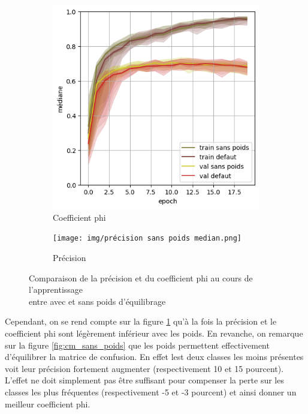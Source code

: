\documentclass{article}
\begin{document}
\begin{figure}[H]
    \centering
    \captionsetup{justification=centering}
    \begin{subfigure}{0.4\textwidth}
      \includegraphics[width=\textwidth]{img/coefficient phi sans poids median.png}
      \centering
      \caption{Coefficient phi }
    \end{subfigure}
    \begin{subfigure}{0.4\textwidth}
      \texttt{[image: img/précision sans poids median.png]}
      \centering
      \caption{Précision}
    \end{subfigure}
    \caption{
        Comparaison de la précision et du coefficient phi au cours de l'apprentissage\\
        entre avec et sans poids d'équilibrage
    }
    \label{fig:modele_sans_poids}
\end{figure}
Cependant, on se rend compte sur la figure \ref{fig:modele_sans_poids} qu'à la fois la précision et le coefficient phi sont légèrement inférieur avec les poids. 
En revanche, on remarque sur la figure \ref{fig:cm_sans_poids} que les poids permettent effectivement d'équilibrer la matrice de confusion.
En effet lest deux classes les moins présentes voit leur précision fortement augmenter (respectivement 10 et 15 pourcent). 
L'effet ne doit simplement pas être suffisant pour compenser la perte sur les classes les plus fréquentes (respectivement -5 et -3 pourcent) et ainsi donner un meilleur coefficient phi.
\end{document}
